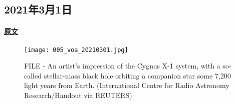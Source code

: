 \subsection{2021年3月1日}
\paragraph{\href{https://www.51voa.com/VOA_Special_English/new-study-black-hole-may-be-larger-than-expected-86383.html}{原文}}

\begin{figure}[H]
\centering
\texttt{[image: 005\_voa\_20210301.jpg]}
\caption{FILE - An artist's impression of the Cygnus X-1 system, with a so-called stellar-mass black hole orbiting a companion star some 7,200 light years from Earth. (International Centre for Radio Astronomy Research/Handout via REUTERS)}
\end{figure}

